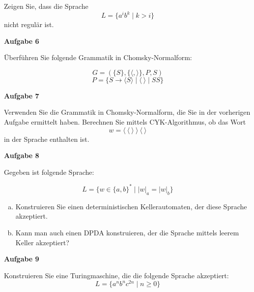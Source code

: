 \documentclass[a4paper,12pt]{article}
\newcommand{\Aufgabe}[1]{
	{
		\vspace*{0.5cm}
		\textsf{\textbf{Aufgabe #1}}
		\vspace*{0.2cm}
		
	}
}
\begin{document}
	Zeigen Sie, dass die Sprache
	$$L=\{a^ib^k \mid k > i\}$$
	nicht regulär ist.
	
	\Aufgabe{6}
	
	Überführen Sie folgende Grammatik in Chomsky-Normalform:
	
	$$G=(\{S\}, \{\langle,\rangle\},P,S)$$
	$$P=\{S \rightarrow \langle S\rangle \mid \langle\:\rangle \mid SS\}$$
	
	\Aufgabe{7}
	
	Verwenden Sie die Grammatik in Chomsky-Normalform, die Sie in der vorherigen Aufgabe ermittelt haben. Berechnen Sie mittels CYK-Algorithmus, ob das Wort
	$$w=\langle\:\langle\:\rangle\:\rangle\:\langle\:\rangle$$ in der Sprache enthalten ist.
	
	\Aufgabe{8}
	
	Gegeben ist folgende Sprache:
	
	$$L=\{w \in \{a,b\}^* \mid |w|_a=|w|_b\}$$
	
	\begin{enumerate}[a)]
		\item Konstruieren Sie einen deterministischen Kellerautomaten, der diese Sprache akzeptiert.
		\item Kann man auch einen DPDA konstruieren, der die Sprache mittels leerem Keller akzeptiert?
	\end{enumerate}
	
	\Aufgabe{9}
	
	Konstruieren Sie eine Turingmaschine, die die folgende Sprache akzeptiert:
	$$L=\{a^nb^nc^{2n} \mid n \geq 0\}$$
\end{document}
